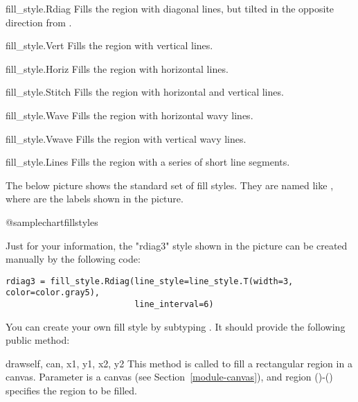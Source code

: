 \documentclass{howto}
\newcommand{\pxref}[1]{see Section~\ref{#1}}
\begin{document}
\begin{classdesc*}{fill_style.Rdiag}
Fills the region with diagonal lines, but tilted in the opposite
direction from .
\end{classdesc*}

\begin{classdesc*}{fill_style.Vert}
Fills the region with vertical lines.
\end{classdesc*}

\begin{classdesc*}{fill_style.Horiz}
Fills the region with horizontal lines.
\end{classdesc*}

\begin{classdesc*}{fill_style.Stitch}
Fills the region with horizontal and vertical lines.
\end{classdesc*}

\begin{classdesc*}{fill_style.Wave}
Fills the region with horizontal wavy lines.
\end{classdesc*}

\begin{classdesc*}{fill_style.Vwave}
Fills the region with vertical wavy lines.
\end{classdesc*}

\begin{classdesc*}{fill_style.Lines}
Fills the region with a series of short line segments.
\end{classdesc*}

The below picture shows the standard set of fill styles. They are named
like , where  are the labels shown
in the picture.

@samplechart{fillstyles}

Just for your information, the "rdiag3" style shown in the picture can
be created manually by the following code:

\begin{verbatim}
rdiag3 = fill_style.Rdiag(line_style=line_style.T(width=3, color=color.gray5),
                          line_interval=6)
\end{verbatim}

You can create your own fill style by subtyping .
It should provide the following public method:

\begin{methoddesc}{draw}{self, can, x1, y1, x2, y2}
  This method is called to fill a rectangular
  region in a canvas. Parameter
   is a canvas (\pxref{module-canvas}), and
  region ()-() specifies the region to be filled.
\end{methoddesc}
\end{document}
